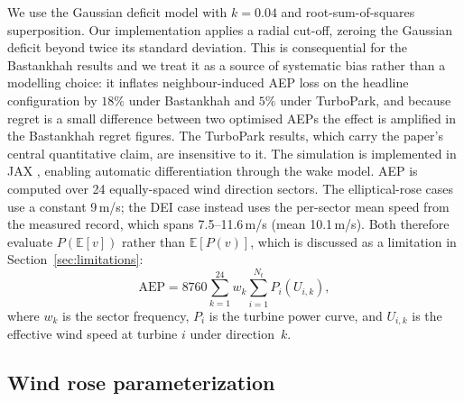 \documentclass[wes, manuscript]{copernicus}
\begin{document}
We use the \citet{Bastankhah2014} Gaussian deficit model with $k = 0.04$ and root-sum-of-squares superposition.
Our implementation applies a radial cut-off, zeroing the Gaussian deficit beyond twice its standard deviation. This is consequential for the Bastankhah results and we treat it as a source of systematic bias rather than a modelling choice: it inflates neighbour-induced AEP loss on the headline configuration by $18\%$ under Bastankhah and $5\%$ under TurboPark, and because regret is a small difference between two optimised AEPs the effect is amplified in the Bastankhah regret figures. The TurboPark results, which carry the paper's central quantitative claim, are insensitive to it.
The simulation is implemented in JAX \citep{jax2018github}, enabling automatic differentiation through the wake model.
AEP is computed over 24 equally-spaced wind direction sectors. The elliptical-rose cases use a constant 9\,m/s; the DEI case instead uses the per-sector mean speed from the measured record, which spans 7.5--11.6\,m/s (mean 10.1\,m/s). Both therefore evaluate $P(\mathbb{E}[v])$ rather than $\mathbb{E}[P(v)]$, which is discussed as a limitation in Section~\ref{sec:limitations}:
\begin{equation}
    \text{AEP} = 8760 \sum_{k=1}^{24} w_k \sum_{i=1}^{N_t} P_i(U_{i,k}),
\end{equation}
where $w_k$ is the sector frequency, $P_i$ is the turbine power curve, and $U_{i,k}$ is the effective wind speed at turbine $i$ under direction~$k$.

\subsection{Wind rose parameterization}
\end{document}
